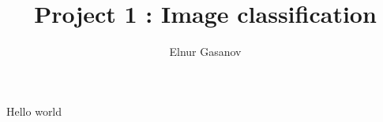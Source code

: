 \documentclass{article}
\title{Project 1 : Image classification}
\author{Elnur Gasanov}
\date{}
\begin{document}
\maketitle
Hello world
\end{document}
